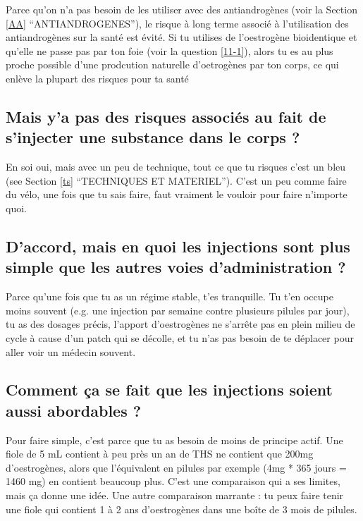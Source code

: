 \documentclass{article}
\begin{document}
Parce qu'on n'a pas besoin de les utiliser avec des antiandrogènes (voir la Section \ref{AA} “ANTIANDROGENES”), le risque à long terme associé à l'utilisation des antiandrogènes sur la santé est évité. Si tu utilises de l'oestrogène bioidentique et qu'elle ne passe pas par ton foie (voir la question \ref{11-1}), alors tu es au plus proche possible d'une prodcution naturelle d'oetrogènes par ton corps, ce qui enlève la plupart des risques pour ta santé

\subsection{Mais y'a pas des risques associés au fait de s'injecter une substance dans le corps ?}

En soi oui, mais avec un peu de technique, tout ce que tu risques c'est un bleu (see Section \ref{ts} “TECHNIQUES ET MATERIEL”). C'est un peu comme faire du vélo, une fois que tu sais faire, faut vraiment le vouloir pour faire n'importe quoi.

\subsection{D'accord, mais en quoi les injections sont plus simple que les autres voies d'administration ?}

Parce qu'une fois que tu as un régime stable, t'es tranquille. Tu t'en occupe moins souvent (e.g. une injection par semaine contre plusieurs pilules par jour), tu as des dosages précis, l'apport d'oestrogènes ne s'arrête pas en plein milieu de cycle à cause d'un patch qui se décolle, et tu n'as pas besoin de te déplacer pour aller voir un médecin souvent.

\subsection{Comment ça se fait que les injections soient aussi abordables ?}

Pour faire simple, c'est parce que tu as besoin de moins de principe actif. Une fiole de 5 mL contient à peu près un an de THS ne contient que 200mg d'oestrogènes, alors que l'équivalent en pilules par exemple (4mg * 365 jours = 1460 mg) en contient beaucoup plus. C'est une comparaison qui a ses limites, mais ça donne une idée. Une autre comparaison marrante : tu peux faire tenir une fiole qui contient 1 à 2 ans d'oestrogènes dans une boîte de 3 mois de pilules. 
\end{document}
